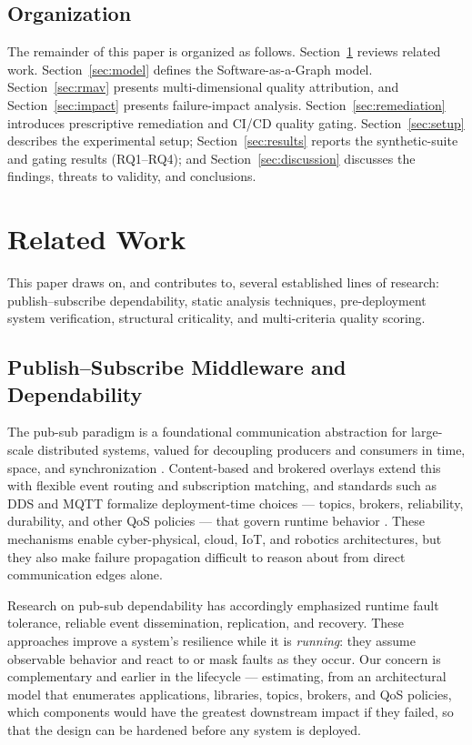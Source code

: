 \documentclass[review]{elsarticle}
\begin{document}
\subsection{Organization}

The remainder of this paper is organized as follows. Section~\ref{sec:relatedwork} reviews related
work. Section~\ref{sec:model} defines the Software-as-a-Graph model. Section~\ref{sec:rmav}
presents multi-dimensional quality attribution, and Section~\ref{sec:impact} presents
failure-impact analysis. Section~\ref{sec:remediation} introduces prescriptive remediation and
CI/CD quality gating. Section~\ref{sec:setup} describes the experimental setup;
Section~\ref{sec:results} reports the synthetic-suite and gating results (RQ1--RQ4); and
Section~\ref{sec:discussion} discusses the findings, threats to validity, and conclusions.

\section{Related Work}
\label{sec:relatedwork}

This paper draws on, and contributes to, several established lines of research: publish--subscribe
dependability, static analysis techniques, pre-deployment system verification, structural
criticality, and multi-criteria quality scoring.

\subsection{Publish--Subscribe Middleware and Dependability}

The pub-sub paradigm is a foundational communication abstraction for large-scale distributed
systems, valued for decoupling producers and consumers in time, space, and synchronization
\cite{Eugster2003}. Content-based and brokered overlays extend this with flexible event routing and
subscription matching, and standards such as DDS and MQTT formalize deployment-time choices ---
topics, brokers, reliability, durability, and other QoS policies --- that govern runtime behavior
\cite{OMG2015DDS,OASIS2019MQTT}. These mechanisms enable cyber-physical, cloud, IoT, and robotics
architectures, but they also make failure propagation difficult to reason about from direct
communication edges alone.

Research on pub-sub dependability has accordingly emphasized runtime fault tolerance, reliable event
dissemination, replication, and recovery. These approaches improve a system's resilience while it is
\emph{running}: they assume observable behavior and react to or mask faults as they occur. Our
concern is complementary and earlier in the lifecycle --- estimating, from an architectural model
that enumerates applications, libraries, topics, brokers, and QoS policies, which components would
have the greatest downstream impact if they failed, so that the design can be hardened before any
system is deployed.
\end{document}
